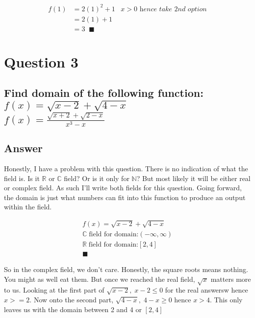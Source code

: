 \documentclass[17 pt]{extarticle}
\begin{document}
        \begin{equation*}
            \begin{split}
                f(1) &= 2(1)^2 + 1 \; \; \; \textit{$x > 0$ hence take 2nd option} \\
                &= 2(1) + 1 \\
                &= 3 \; \; \blacksquare
            \end{split}
            \end{equation*}
\section{Question 3}

\subsection*{Find domain of the following function: \newline \\ $f(x) =\sqrt{x-2} + \sqrt{4-x}$
\newline \\ $f(x) = \frac{\sqrt{x+2} + \sqrt{2-x}}{x^3-x}$}

\vspace{10mm}
\subsection*{Answer}

Honestly, I have a problem with this question. There is no indication of what the field is. Is it $\mathbb{R}$ or $\mathbb{C}$ field? Or is it only for $\mathbb{N}$? But most likely it will be either real or complex field. As 
such I'll write both fields for this question. Going forward, the domain is just what numbers can fit into this function to produce an output within the field.

\begin{equation*}
    \begin{split}
        f(x) =\sqrt{x-2} + \sqrt{4-x} \\
        \mathbb{C} \; \text{field for domain:} (- \infty, \infty) \\
        \mathbb{R} \; \text{field for domain:} [2,4] \\
         \blacksquare
    \end{split}
    \end{equation*}

So in the complex field, we don't care. Honestly, the square roots means nothing. You might as well eat them. But once we reached the 
real field, $\sqrt{x}$ matters more to us. Looking at the first part of $\sqrt{x-2}, \; x-2 \leq 0$ for the real answersw hence $x>=2$. Now onto the second part, $\sqrt{4-x}, \;
4-x \geq 0$ hence $x>4$. This only leaves us with the domain between 2 and 4 or $ [2,4] $
\end{document}
